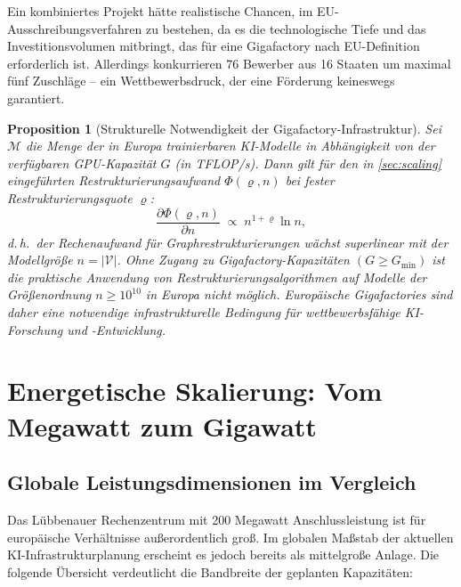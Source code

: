 ﻿\documentclass[12pt, a4paper, openany]{report}
\newtheorem{proposition}[theorem]{Proposition}
\newcommand{\calV}{\mathcal{V}}
\begin{document}
Ein kombiniertes Projekt hätte realistische Chancen, im EU-Ausschreibungsverfahren
zu bestehen, da es die technologische Tiefe und das Investitionsvolumen
mitbringt, das für eine Gigafactory nach EU-Definition erforderlich ist.
Allerdings konkurrieren 76 Bewerber aus 16 Staaten um maximal fünf
Zuschläge -- ein Wettbewerbsdruck, der eine Förderung keineswegs garantiert.

\begin{proposition}[Strukturelle Notwendigkeit der Gigafactory-Infrastruktur]
	\label{prop:gigafactory_notwendigkeit}
	Sei $\mathcal{M}$ die Menge der in Europa trainierbaren KI-Modelle in
	Abhängigkeit von der verfügbaren GPU-Kapazität $G$ (in TFLOP/s). Dann
	gilt für den in \cref{sec:scaling} eingeführten Restrukturierungsaufwand
	$\Phi(\varrho, n)$ bei fester Restrukturierungsquote $\varrho$:
	\[
	\frac{\partial \Phi(\varrho, n)}{\partial n}
	\;\propto\; n^{1 + \varrho} \ln n,
	\]
	d.\,h.\ der Rechenaufwand für Graphrestrukturierungen wächst
	superlinear mit der Modellgröße $n = |\calV|$. Ohne Zugang zu
	Gigafactory-Kapazitäten $(G \geq G_{\min})$ ist die praktische Anwendung
	von Restrukturierungsalgorithmen auf Modelle der Größenordnung $n \geq 10^{10}$
	in Europa nicht möglich. Europäische Gigafactories sind daher eine
	\emph{notwendige} infrastrukturelle Bedingung für wettbewerbsfähige
	KI-Forschung und -Entwicklung.
\end{proposition}

\section{Energetische Skalierung: Vom Megawatt zum Gigawatt}
\label{sec:energetische_skalierung}

\subsection{Globale Leistungsdimensionen im Vergleich}

Das Lübbenauer Rechenzentrum mit 200 Megawatt Anschlussleistung ist für
europäische Verhältnisse außerordentlich groß. Im globalen Maßstab der
aktuellen KI-Infrastrukturplanung erscheint es jedoch bereits als
mittelgroße Anlage. Die folgende Übersicht verdeutlicht die Bandbreite
der geplanten Kapazitäten:
\end{document}

